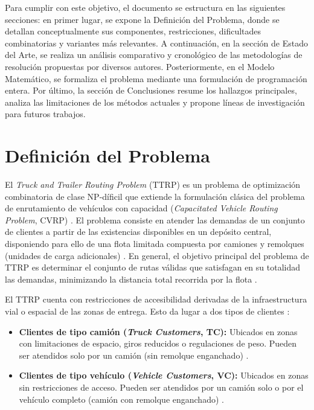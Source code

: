 \documentclass[letter, 10pt]{article}
\begin{document}
\vspace{0.25cm} 

Para cumplir con este objetivo, el documento se estructura en las siguientes secciones: en primer lugar, se expone la Definici\'on del Problema, donde se detallan conceptualmente sus componentes, restricciones, dificultades combinatorias y variantes m\'as relevantes.
A continuaci\'on, en la secci\'on de Estado del Arte, se realiza un an\'alisis comparativo y cronol\'ogico de las metodolog\'ias de resoluci\'on propuestas por diversos autores.
Posteriormente, en el Modelo Matem\'atico, se formaliza el problema mediante una formulaci\'on de programaci\'on entera.
Por \'ultimo, la secci\'on de Conclusiones resume los hallazgos principales, analiza las limitaciones de los m\'etodos actuales y propone l\'ineas de investigaci\'on para futuros trabajos.

\section{Definici\'on del Problema}

El \textit{Truck and Trailer Routing Problem} (TTRP) es un problema de optimizaci\'on combinatoria de clase NP-d\'ificil que extiende la formulaci\'on cl\'asica del problema de enrutamiento de veh\'iculos con capacidad (\textit{Capacitated Vehicle Routing Problem}, CVRP) \cite{chao2002tabu, lin2009solving}. 
El problema consiste en atender las demandas de un conjunto de clientes a partir de las existencias disponibles en un dep\'osito central, disponiendo para ello de una flota limitada compuesta por camiones y remolques (unidades de carga adicionales) \cite{bartolini2020two,chao2002tabu}.
En general, el objetivo principal del problema de TTRP es determinar el conjunto de rutas v\'alidas que satisfagan en su totalidad las demandas, minimizando la distancia total recorrida por la flota \cite{chao2002tabu,perez2023radial}.


\vspace{0.25cm}

El TTRP cuenta con restricciones de accesibilidad derivadas de la infraestructura vial o espacial de las zonas de entrega. Esto da lugar a dos tipos de clientes \cite{chao2002tabu}:
\begin{itemize}
    \item \textbf{Clientes de tipo cami\'on (\textit{Truck Customers}, TC):} Ubicados en zonas con limitaciones de espacio, giros reducidos o regulaciones de peso. Pueden ser atendidos solo por un cami\'on (sin remolque enganchado) \cite{lin2009solving}.
    \item \textbf{Clientes de tipo veh\'iculo (\textit{Vehicle Customers}, VC):} Ubicados en zonas sin restricciones de acceso. Pueden ser atendidos por un cami\'on solo o por el veh\'iculo completo (cami\'on con remolque enganchado) \cite{chao2002tabu,lin2009solving}.
\end{itemize}
\end{document}
